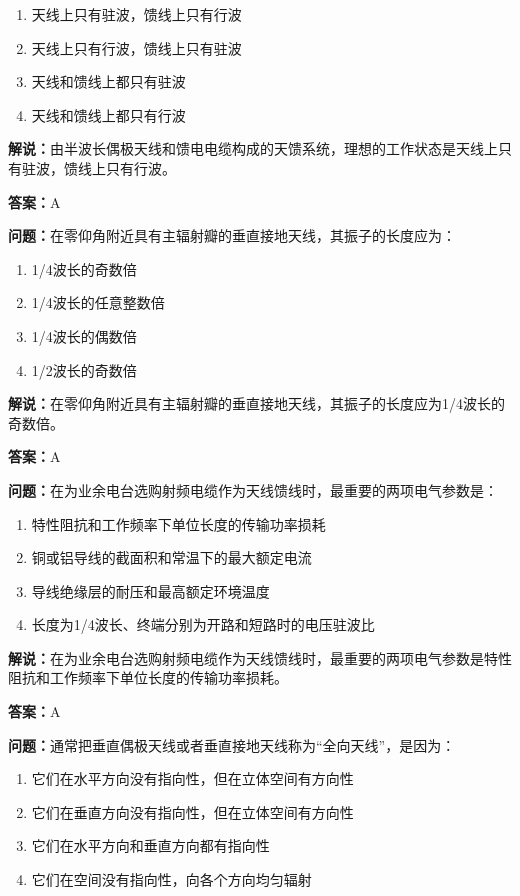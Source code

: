 \documentclass[UTF8]{ctexbook}
\begin{document}
\begin{enumerate}[label=\Alph*), leftmargin=3em]
  \item 天线上只有驻波，馈线上只有行波
  \item 天线上只有行波，馈线上只有驻波
  \item 天线和馈线上都只有驻波
  \item 天线和馈线上都只有行波
\end{enumerate}

\textbf{解说：}由半波长偶极天线和馈电电缆构成的天馈系统，理想的工作状态是天线上只有驻波，馈线上只有行波。%

\textbf{答案：}A

\textbf{问题：}在零仰角附近具有主辐射瓣的垂直接地天线，其振子的长度应为：

\begin{enumerate}[label=\Alph*), leftmargin=3em]
  \item 1/4波长的奇数倍
  \item 1/4波长的任意整数倍
  \item 1/4波长的偶数倍
  \item 1/2波长的奇数倍
\end{enumerate}

\textbf{解说：}在零仰角附近具有主辐射瓣的垂直接地天线，其振子的长度应为1/4波长的奇数倍。%

\textbf{答案：}A

\textbf{问题：}在为业余电台选购射频电缆作为天线馈线时，最重要的两项电气参数是：

\begin{enumerate}[label=\Alph*), leftmargin=3em]
  \item 特性阻抗和工作频率下单位长度的传输功率损耗
  \item 铜或铝导线的截面积和常温下的最大额定电流
  \item 导线绝缘层的耐压和最高额定环境温度
  \item 长度为1/4波长、终端分别为开路和短路时的电压驻波比
\end{enumerate}

\textbf{解说：}在为业余电台选购射频电缆作为天线馈线时，最重要的两项电气参数是特性阻抗和工作频率下单位长度的传输功率损耗。%

\textbf{答案：}A

\textbf{问题：}通常把垂直偶极天线或者垂直接地天线称为“全向天线”，是因为：

\begin{enumerate}[label=\Alph*), leftmargin=3em]
  \item 它们在水平方向没有指向性，但在立体空间有方向性
  \item 它们在垂直方向没有指向性，但在立体空间有方向性
  \item 它们在水平方向和垂直方向都有指向性
  \item 它们在空间没有指向性，向各个方向均匀辐射
\end{enumerate}
\end{document}
